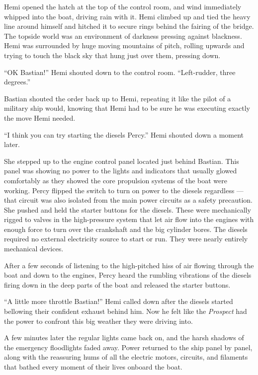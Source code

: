\documentclass[
]{scrbook}
\begin{document}
Hemi opened the hatch at the top of the control room, and wind
immediately whipped into the boat, driving rain with it. Hemi climbed up
and tied the heavy line around himself and hitched it to secure rings
behind the fairing of the bridge. The topside world was an environment
of darkness pressing against blackness. Hemi was surrounded by huge
moving mountains of pitch, rolling upwards and trying to touch the black
sky that hung just over them, pressing down.

``OK Bastian!'' Hemi shouted down to the control room. ``Left-rudder,
three degrees.''

Bastian shouted the order back up to Hemi, repeating it like the pilot
of a military ship would, knowing that Hemi had to be sure he was
executing exactly the move Hemi needed.

``I think you can try starting the diesels Percy.'' Hemi shouted down a
moment later.

She stepped up to the engine control panel located just behind Bastian.
This panel was showing no power to the lights and indicators that
usually glowed comfortably as they showed the core propulsion systems of
the boat were working. Percy flipped the switch to turn on power to the
diesels regardless --- that circuit was also isolated from the main
power circuits as a safety precaution. She pushed and held the starter
buttons for the diesels. These were mechanically rigged to valves in the
high-pressure system that let air flow into the engines with enough
force to turn over the crankshaft and the big cylinder bores. The
diesels required no external electricity source to start or run. They
were nearly entirely mechanical devices.

After a few seconds of listening to the high-pitched hiss of air flowing
through the boat and down to the engines, Percy heard the rumbling
vibrations of the diesels firing down in the deep parts of the boat and
released the starter buttons.

``A little more throttle Bastian!'' Hemi called down after the diesels
started bellowing their confident exhaust behind him. Now he felt like
the \emph{Prospect} had the power to confront this big weather they were
driving into.

A few minutes later the regular lights came back on, and the harsh
shadows of the emergency floodlights faded away. Power returned to the
ship panel by panel, along with the reassuring hums of all the electric
motors, circuits, and filaments that bathed every moment of their lives
onboard the boat.
\end{document}
